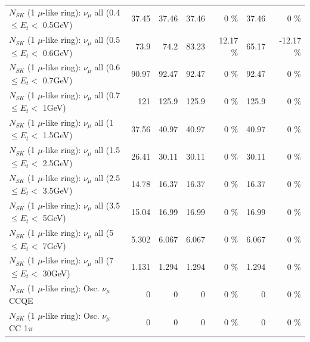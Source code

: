 \begin{table}
\begin{tabular}{| l | r | r | r  r | r  r |}
       $N_{SK}$ (1 $\mu$-like ring): $\nu_{\mu}$ all (0.4 $\leq E_{t} <$ 0.5GeV) &           37.45 &           37.46 &           37.46 &        0 \%  &           37.46 &        0 \%  \\ 
       $N_{SK}$ (1 $\mu$-like ring): $\nu_{\mu}$ all (0.5 $\leq E_{t} <$ 0.6GeV) &            73.9 &            74.2 &           83.23 &    12.17 \%  &           65.17 &   -12.17 \%  \\ 
       $N_{SK}$ (1 $\mu$-like ring): $\nu_{\mu}$ all (0.6 $\leq E_{t} <$ 0.7GeV) &           90.97 &           92.47 &           92.47 &        0 \%  &           92.47 &        0 \%  \\ 
         $N_{SK}$ (1 $\mu$-like ring): $\nu_{\mu}$ all (0.7 $\leq E_{t} <$ 1GeV) &             121 &           125.9 &           125.9 &        0 \%  &           125.9 &        0 \%  \\ 
         $N_{SK}$ (1 $\mu$-like ring): $\nu_{\mu}$ all (1 $\leq E_{t} <$ 1.5GeV) &           37.56 &           40.97 &           40.97 &        0 \%  &           40.97 &        0 \%  \\ 
       $N_{SK}$ (1 $\mu$-like ring): $\nu_{\mu}$ all (1.5 $\leq E_{t} <$ 2.5GeV) &           26.41 &           30.11 &           30.11 &        0 \%  &           30.11 &        0 \%  \\ 
       $N_{SK}$ (1 $\mu$-like ring): $\nu_{\mu}$ all (2.5 $\leq E_{t} <$ 3.5GeV) &           14.78 &           16.37 &           16.37 &        0 \%  &           16.37 &        0 \%  \\ 
         $N_{SK}$ (1 $\mu$-like ring): $\nu_{\mu}$ all (3.5 $\leq E_{t} <$ 5GeV) &           15.04 &           16.99 &           16.99 &        0 \%  &           16.99 &        0 \%  \\ 
           $N_{SK}$ (1 $\mu$-like ring): $\nu_{\mu}$ all (5 $\leq E_{t} <$ 7GeV) &           5.302 &           6.067 &           6.067 &        0 \%  &           6.067 &        0 \%  \\ 
          $N_{SK}$ (1 $\mu$-like ring): $\nu_{\mu}$ all (7 $\leq E_{t} <$ 30GeV) &           1.131 &           1.294 &           1.294 &        0 \%  &           1.294 &        0 \%  \\ 
\hline
\hline
                               $N_{SK}$ (1 $\mu$-like ring): Osc. $\nu_\mu$ CCQE &               0 &               0 &               0 &        0 \%  &               0 &        0 \%  \\ 
                          $N_{SK}$ (1 $\mu$-like ring): Osc. $\nu_\mu$ CC 1$\pi$ &               0 &               0 &               0 &        0 \%  &               0 &        0 \%  \\ 

\end{tabular}
\end{table}
